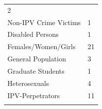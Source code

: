 \documentclass[]{tufte-handout}
\begin{document}
\begin{longtable}[]{@{}ll@{}}
\begin{minipage}[t]{0.21\columnwidth}
2\strut
\end{minipage}\tabularnewline
\begin{minipage}[t]{0.59\columnwidth}\raggedright\strut
Non-IPV Crime Victims\strut
\end{minipage} & \begin{minipage}[t]{0.21\columnwidth}\raggedright\strut
1\strut
\end{minipage}\tabularnewline
\begin{minipage}[t]{0.59\columnwidth}\raggedright\strut
Disabled Persons\strut
\end{minipage} & \begin{minipage}[t]{0.21\columnwidth}\raggedright\strut
1\strut
\end{minipage}\tabularnewline
\begin{minipage}[t]{0.59\columnwidth}\raggedright\strut
Females/Women/Girls\strut
\end{minipage} & \begin{minipage}[t]{0.21\columnwidth}\raggedright\strut
21\strut
\end{minipage}\tabularnewline
\begin{minipage}[t]{0.59\columnwidth}\raggedright\strut
General Population\strut
\end{minipage} & \begin{minipage}[t]{0.21\columnwidth}\raggedright\strut
3\strut
\end{minipage}\tabularnewline
\begin{minipage}[t]{0.59\columnwidth}\raggedright\strut
Graduate Students\strut
\end{minipage} & \begin{minipage}[t]{0.21\columnwidth}\raggedright\strut
1\strut
\end{minipage}\tabularnewline
\begin{minipage}[t]{0.59\columnwidth}\raggedright\strut
Heterosexuals\strut
\end{minipage} & \begin{minipage}[t]{0.21\columnwidth}\raggedright\strut
4\strut
\end{minipage}\tabularnewline
\begin{minipage}[t]{0.59\columnwidth}\raggedright\strut
IPV-Perpetrators\strut
\end{minipage} & \begin{minipage}[t]{0.21\columnwidth}\raggedright\strut
11\strut
\end{minipage}\tabularnewline
\begin{minipage}[t]{0.59\columnwidth}\raggedright\strut

\end{minipage}
\end{longtable}
\end{document}
